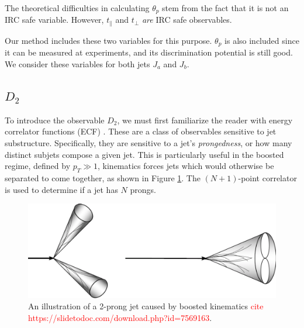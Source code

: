 \documentclass[10pt,a4paper]{book}
\newcommand\todo[1]{\textcolor{red}{#1}}
\begin{document}
The theoretical difficulties in calculating $\theta_p$ stem from the fact that it is not an IRC safe variable. However, $t_\parallel$ and $t_\perp$ \emph{are} IRC safe observables. 

Our method includes these two variables for this purpose. $\theta_p$ is also included since it can be measured at experiments, and its discrimination potential is still good. We consider these variables for both jets $J_a$ and $J_b$. 

\subsection{$D_2$}

To introduce the observable $D_2$, we must first familiarize the reader with energy correlator functions (ECF) \cite{Larkoski:2013eya}. These are a class of observables sensitive to jet substructure. Specifically, they are sensitive to a jet's \emph{prongedness}, or how many distinct subjets compose a given jet. This is particularly useful in the boosted regime, defined by $p_T \gg 1$, kinematics forces jets which would otherwise be separated to come together, as shown in Figure \ref{two pronged boost}. The $(N+1)$-point correlator is used to determine if a jet has $N$ prongs.

\begin{figure}
\centering
\includegraphics[scale=0.35]{ch4_images/two_prong}
\caption{An illustration of a 2-prong jet caused by boosted kinematics \todo{cite https://slidetodoc.com/download.php?id=7569163}.}
\label{two pronged boost}
\end{figure}
\end{document}
